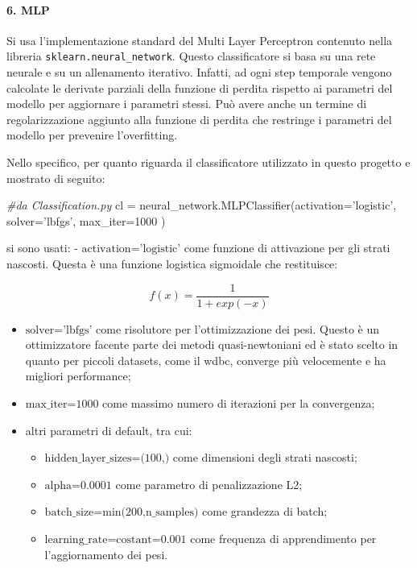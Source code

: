 \documentclass[11pt]{article}
\providecommand{\tightlist}{%
      \setlength{\itemsep}{0pt}\setlength{\parskip}{0pt}}
\newenvironment{Shaded}{}{}
\newcommand{\DecValTok}[1]{\textcolor[rgb]{0.25,0.63,0.44}{{#1}}}
\newcommand{\StringTok}[1]{\textcolor[rgb]{0.25,0.44,0.63}{{#1}}}
\newcommand{\CommentTok}[1]{\textcolor[rgb]{0.38,0.63,0.69}{\textit{{#1}}}}
\newcommand{\NormalTok}[1]{{#1}}
\newcommand{\OperatorTok}[1]{\textcolor[rgb]{0.40,0.40,0.40}{{#1}}}
\begin{document}
    \paragraph{6. MLP}\label{mlp}

    Si usa l'implementazione standard del Multi Layer Perceptron contenuto
nella libreria \texttt{sklearn.neural\_network}. Questo classificatore
si basa su una rete neurale e su un allenamento iterativo. Infatti, ad
ogni step temporale vengono calcolate le derivate parziali della
funzione di perdita rispetto ai parametri del modello per aggiornare i
parametri stessi. Può avere anche un termine di regolarizzazione
aggiunto alla funzione di perdita che restringe i parametri del modello
per prevenire l'overfitting.

Nello specifico, per quanto riguarda il classificatore utilizzato in
questo progetto e mostrato di seguito:

\begin{Shaded}
\begin{Highlighting}[]
\CommentTok{#da Classification.py}
\NormalTok{cl }\OperatorTok{=}\NormalTok{ neural_network.MLPClassifier(activation}\OperatorTok{=}\StringTok{'logistic'}\NormalTok{, solver}\OperatorTok{=}\StringTok{'lbfgs'}\NormalTok{, max_iter}\OperatorTok{=}\DecValTok{1000}\NormalTok{ )       }
\end{Highlighting}
\end{Shaded}

si sono usati: - \(\text{activation='logistic'}\) come funzione di
attivazione per gli strati nascosti. Questa è una funzione logistica
sigmoidale che restituisce:

\begin{equation*}
    f(x) = \frac{1}{1+exp(-x)}
    \end{equation*}

\begin{itemize}
\tightlist
\item
  \(\text{solver='lbfgs'}\) come risolutore per l'ottimizzazione dei
  pesi. Questo è un ottimizzatore facente parte dei metodi
  quasi-newtoniani ed è stato scelto in quanto per piccoli datasets,
  come il wdbc, converge più velocemente e ha migliori performance;
\item
  \(\text{max_iter=1000}\) come massimo numero di iterazioni per la
  convergenza;
\item
  altri parametri di default, tra cui:

  \begin{itemize}
  \tightlist
  \item
    \(\text{hidden_layer_sizes=(100,)}\) come dimensioni degli strati
    nascosti;
  \item
    \(\text{alpha=0.0001}\) come parametro di penalizzazione L2;
  \item
    \(\text{batch_size=min(200,n_samples)}\) come grandezza di batch;
  \item
    \(\text{learning_rate=costant=0.001}\) come frequenza di
    apprendimento per l'aggiornamento dei pesi.
  \end{itemize}
\end{itemize}
\end{document}
